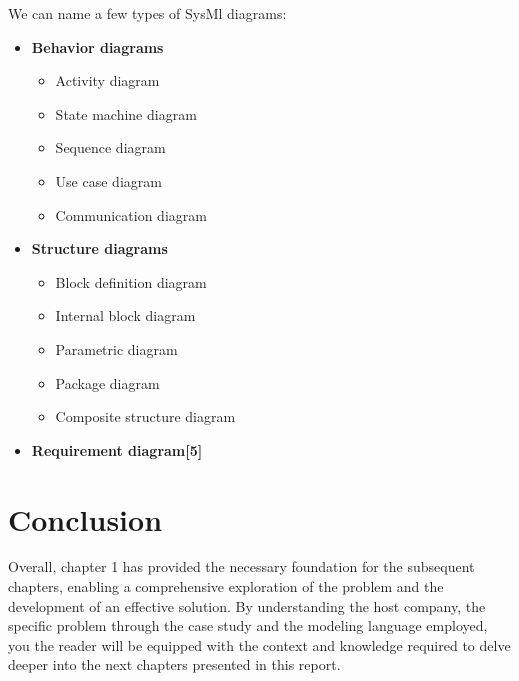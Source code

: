 We can name a few types of SysMl diagrams:

\begin{itemize}
    \item \textbf{Behavior diagrams \cite{sysml_modeling}}
    \begin{itemize}
        \item Activity diagram
        \item State machine diagram
        \item Sequence diagram
        \item Use case diagram
        \item Communication diagram
    \end{itemize}

    \item \textbf{Structure diagrams \cite{sysml_modeling}}
    \begin{itemize}
        \item Block definition diagram
        \item Internal block diagram
        \item Parametric diagram
        \item Package diagram
        \item Composite structure diagram
    \end{itemize}

    \item \textbf{Requirement diagram[5]}
\end{itemize}

\section*{\fontsize{15}{18}\selectfont Conclusion}

\hspace*{\parindent}Overall, chapter 1 has provided the necessary foundation for the subsequent chapters, enabling a
comprehensive exploration of the problem and the development of an effective solution. By understanding the host company, the specific problem through the case study and the modeling language
employed, you the reader will be equipped with the context and knowledge required to delve deeper
into the next chapters presented in this report.